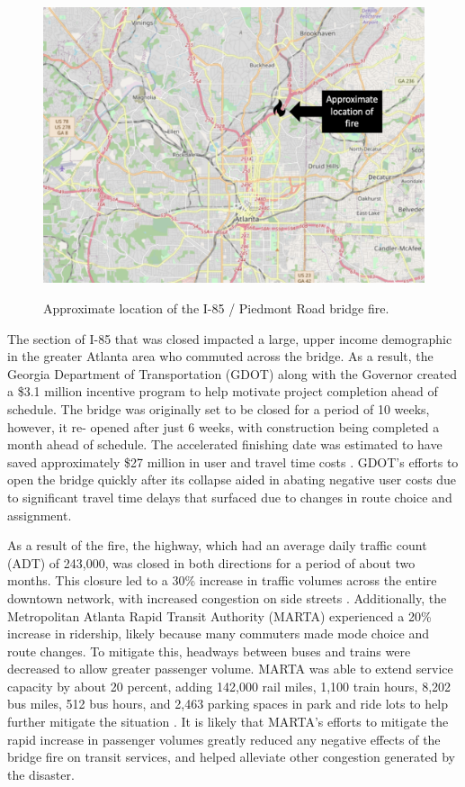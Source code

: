 \begin{figure}
\begin{center}

{\centering \includegraphics[width=0.75\linewidth]{figures/chapter2/I-85.png}}

\caption{Approximate location of the I-85 / Piedmont Road bridge fire.}\label{fig:i85}

\end{center}
\end{figure}

The section of I-85 that was closed impacted a large, upper income
demographic in the greater
Atlanta area who commuted across the bridge.
As a result, the Georgia Department of Transportation (GDOT) along with
the Governor created a
\$3.1 million incentive program to help motivate project completion ahead
of schedule. The bridge
was originally set to be closed for a period of 10 weeks, however, it re-
opened after just 6
weeks, with construction being completed a month ahead of schedule. The
accelerated finishing
date was estimated to have saved approximately \$27 million in user and
travel time costs
\citep{GDOT2017}. GDOT’s efforts to open the bridge quickly after its
collapse aided in abating negative user costs due to significant travel
time delays that surfaced
due to changes in route choice and assignment.

As a result of the fire, the highway, which had an average daily traffic
count (ADT) of 243,000,
was closed in both directions for a period of about two months. This
closure led to a 30\%
increase in traffic volumes across the entire downtown network, with
increased congestion on side
streets \citep{hamedi2018}. Additionally, the Metropolitan Atlanta Rapid
Transit Authority
(MARTA) experienced a 20\% increase in ridership, likely because many
commuters made mode choice
and route changes. To mitigate this, headways between buses and trains
were decreased to allow
greater passenger volume. MARTA was able to extend service capacity by about 20 percent, adding 142,000 rail miles, 1,100
train hours, 8,202 bus
miles, 512 bus hours, and 2,463 parking spaces in park and ride lots to
help further mitigate the
situation \citep{marta2017, marta2018}. It is likely that MARTA’s efforts
to mitigate the rapid increase in passenger
volumes greatly reduced any negative effects of the bridge
fire on transit services, and helped alleviate other congestion generated by the disaster.

